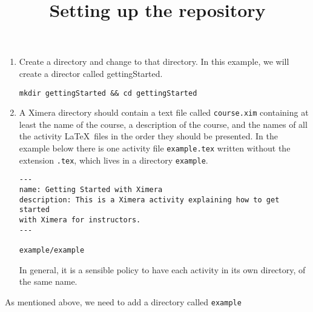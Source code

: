 \documentclass{ximera}
\begin{document}
\title{Setting up the repository}
\begin{enumerate}
\item Create a directory and change to that directory.
In this example, we will create a director called gettingStarted.
\begin{center}
\begin{verbatim}
mkdir gettingStarted && cd gettingStarted
\end{verbatim}
\end{center}
\item A Ximera directory should contain
a text file called \verb!course.xim! containing
at least the name of the course, a description of the course,
and the names of all the activity \LaTeX\ files in the order
they should be presented. In the example below
there is one activity file \verb!example.tex!
written without the extension \verb!.tex!,
which lives in a directory \verb!example!.
\begin{verbatim}
---
name: Getting Started with Ximera
description: This is a Ximera activity explaining how to get started
with Ximera for instructors.
---

example/example
\end{verbatim}
In general, it is a sensible policy to have each
activity in its own directory, of the same name.

\end{enumerate}

\item As mentioned above, we need to add a directory
called \verb!example!
\end{document}

